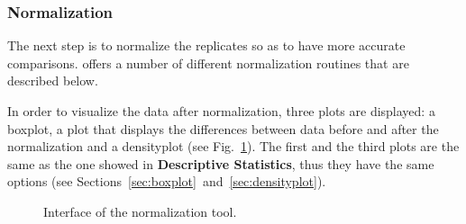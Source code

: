 \documentclass[12pt]{article}
\begin{document}
\subsubsection{Normalization}\label{sec:normalization}

The next step is to normalize the replicates so as to have more accurate 
comparisons.  offers a number of different normalization 
routines that are described below.

In order to visualize the data after normalization, three plots are displayed:
a boxplot, a plot that displays the differences between data before and after 
the normalization and a densityplot (see Fig.~\ref{fig:norma}). The first and 
the third plots are the same as the one showed in \textbf{Descriptive 
Statistics}, thus they have the same options (see 
Sections~\ref{sec:boxplot}~and~\ref{sec:densityplot}).

\begin {figure}
\centering
{}
\caption{Interface of the normalization tool.}\label{fig:norma}
\end {figure}
\end{document}
